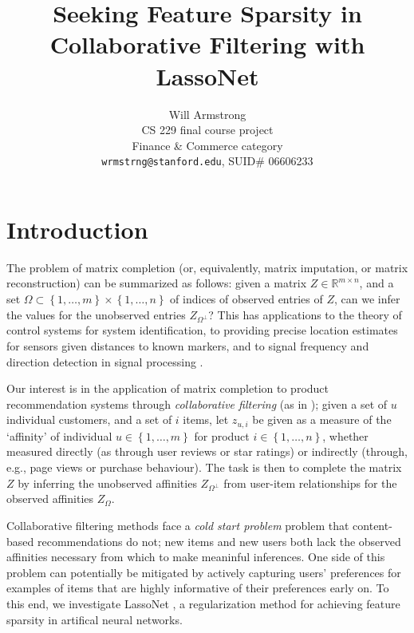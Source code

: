 \documentclass{article}
\title{Seeking Feature Sparsity in Collaborative Filtering with LassoNet}
\author{
  Will Armstrong \\
  CS 229 final course project \\
  Finance \& Commerce category \\
  \texttt{wrmstrng@stanford.edu}, SUID\# 06606233 \\
}
\begin{document}
\maketitle


\section{Introduction}

The problem of matrix completion (or, equivalently, matrix imputation,
or matrix reconstruction) can be summarized as follows: given a matrix
$Z \in \mathbb{R}^{m\times n}$, and a set $\Omega \subset
  \left\{1,\ldots,m\right\}\times\left\{1,\ldots,n\right\}$ of indices of
observed entries of $Z$, can we infer the values for the unobserved
entries $Z_{\Omega^\bot}$?  This has applications to the theory of
control systems for system identification, to providing precise location
estimates for sensors given distances to known markers, and to signal
frequency and direction detection in signal processing
\cite{candes_power_2009}.

Our interest is in the application of matrix completion to product
recommendation systems through \emph{collaborative filtering} (as in
\cite{goldberg_using_1992}); given a set of $u$ individual customers,
and a set of $i$ items, let $z_{u, i}$ be given as a measure of the
`affinity' of individual $u \in \left\{1,\ldots,m\right\}$ for product
$i \in \left\{1,\ldots,n\right\}$, whether measured directly (as through
user reviews or star ratings) or indirectly (through, e.g., page views
or purchase behaviour).  The task is then to complete the matrix $Z$ by
inferring the unobserved affinities $Z_{\Omega^\bot}$ from
user-item relationships for the observed affinities $Z_\Omega$.

Collaborative filtering methods face a \emph{cold start problem} problem
that content-based recommendations do not; new items and new users both
lack the observed affinities necessary from which to make meaninful
inferences. One side of this problem can potentially be mitigated by
actively capturing users' preferences for examples of items that are highly
informative of their preferences early on.  To this end, we investigate
LassoNet \cite{lemhadri_lassonet_2021}, a regularization method for
achieving feature sparsity in artifical neural networks.
\end{document}
